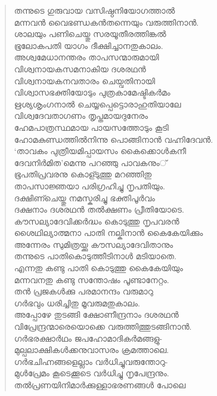 \begin{verse}
തന്നുടെ ഗുരുവായ വസിഷ്ഠനിയോഗത്താല്‍\\
മന്നവന്‍ വൈഭണ്ഡകന്‍തന്നെയും വരുത്തിനാന്‍.\\
ശാലയും പണിചെയ്തു സരയൂതീരത്തിങ്കല്‍\\
ഭൂലോകപതി യാഗം ദീക്ഷിച്ചാനതുകാലം.\\
അശ്വമേധാനന്തരം താപസന്മാരുമായി\\
വിശ്വനായകസമനാകിയ ദശരഥന്‍\\
വിശ്വനായകനവതാരം ചെയ്വതിനായി\\
വിശ്വാസഭക്തിയോടും പുത്രകാമേഷ്ടികര്‍മം\\
ഋശ്യശൃംഗനാല്‍ ചെയ്യപ്പെട്ടൊരാഹുതിയാലേ\\
വിശ്വദേവതാഗണം തൃപ്തമായദുനേരം\\
ഹേമപാത്രസ്ഥമായ പായസത്തോടും കൂടി\\
ഹോമകുണ്ഡത്തില്‍നിന്നു പൊങ്ങിനാന്‍ വഹ്നിദേവന്‍.\\
‘താവകം പുത്രീയമിപ്പായസം കൈക്കൊള്‍കനീ\\
ദേവനിര്‍മിത’മെന്നു പറഞ്ഞു പാവകനും്\\
ഭൂപതിപ്രവരനു കൊള്ടുത്തു മറഞ്ഞിതു\\
താപസാജ്ഞയാ പരിഗ്രഹിച്ചു നൃപതിയും.\\
ദക്ഷിണ്ചെയ്തു നമസ്കരിച്ചു ഭക്തിപൂര്‍വം\\
ദക്ഷനാം ദശരഥന്‍ തല്‍ക്ഷണം പ്രീതിയോടെ.\\
കൗസല്യാദേവിക്കര്‍ദ്ധം കൊടുത്തു നൃപവരന്‍\\
ശൈഥില്യാത്മനാ പാതി നല്കിനാന്‍ കൈകേയിക്കും\\
അന്നേരം സുമിത്രയ്ക്കു കൗസല്യാദേവിതാനും\\
തന്നുടെ പാതികൊടുത്തീടിനാള്‍ മടിയാതെ.\\
എന്നതു കണ്ടു പാതി കൊടുത്തു കൈകേയിയും\\
മന്നവനതു കണ്ടു സന്തോഷം പൂണ്ടാനേറ്റം.\\
തന്‍ പ്രജകള്‍ക്കു പരമാനന്ദം വരുമാറു\\
ഗര്‍ഭവും ധരിച്ചിതു മൂവരുമതുകാലം.\\
അപ്പോഴേ തുടങ്ങി ക്ഷോണീന്ദ്രനാം ദശരഥന്‍\\
വിപ്രേന്ദ്രന്മാരെയൊക്കെ വരുത്തിത്തുടങ്ങിനാന്‍.\\
ഗര്‍ഭരക്ഷാര്‍ഥം ജപഹോമാദികര്‍മങ്ങളു-\\
മുല്പലാക്ഷികള്‍ക്കനുവാസരം ക്രമത്താലെ.\\
ഗര്‍ഭചിഹ്നങ്ങളെല്ലാം വര്‍ധിച്ചുവരുന്തോറു-\\
മുള്‍പ്രേമം കൂടെക്കൂടെ വര്‍ധിച്ചു നൃപേന്ദ്രനും.\\
തല്‍പ്രണയിനിമാര്‍ക്കുള്ളാഭരണങ്ങള്‍ പോലെ\\

\end{verse}
